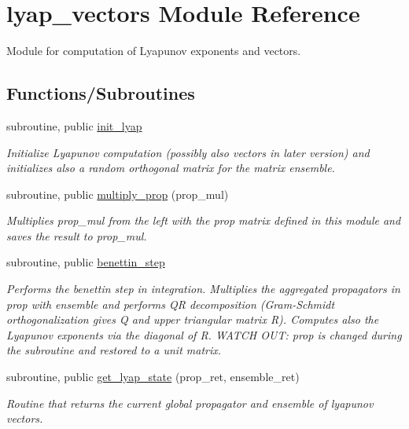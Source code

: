 \hypertarget{namespacelyap__vectors}{}\section{lyap\+\_\+vectors Module Reference}
\label{namespacelyap__vectors}


Module for computation of Lyapunov exponents and vectors.  


\subsection*{Functions/\+Subroutines}
\begin{DoxyCompactItemize}
\item 
subroutine, public \hyperlink{namespacelyap__vectors_a72d9b0b0cb5933542de34def4cdef516}{init\+\_\+lyap}
\begin{DoxyCompactList}\small\item\em Initialize Lyapunov computation (possibly also vectors in later version) and initializes also a random orthogonal matrix for the matrix ensemble. \end{DoxyCompactList}\item 
subroutine, public \hyperlink{namespacelyap__vectors_aec560ddebe1222a0df44b49125bf6d7b}{multiply\+\_\+prop} (prop\+\_\+mul)
\begin{DoxyCompactList}\small\item\em Multiplies prop\+\_\+mul from the left with the prop matrix defined in this module and saves the result to prop\+\_\+mul. \end{DoxyCompactList}\item 
subroutine, public \hyperlink{namespacelyap__vectors_ae6948c534a6ec370975f3843a591720d}{benettin\+\_\+step}
\begin{DoxyCompactList}\small\item\em Performs the benettin step in integration. Multiplies the aggregated propagators in prop with ensemble and performs QR decomposition (Gram-\/\+Schmidt orthogonalization gives Q and upper triangular matrix R). Computes also the Lyapunov exponents via the diagonal of R. W\+A\+T\+CH O\+UT\+: prop is changed during the subroutine and restored to a unit matrix. \end{DoxyCompactList}\item 
subroutine, public \hyperlink{namespacelyap__vectors_a081fa2db33f0a55e2639c558d39b3b24}{get\+\_\+lyap\+\_\+state} (prop\+\_\+ret, ensemble\+\_\+ret)
\begin{DoxyCompactList}\small\item\em Routine that returns the current global propagator and ensemble of lyapunov vectors. \end{DoxyCompactList}\end{DoxyCompactItemize}
